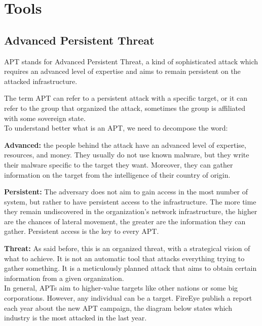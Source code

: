 \chapter{Tools}
\section{Advanced Persistent Threat}

APT stands for Advanced Persistent Threat, a kind of sophisticated attack which requires an advanced level of expertise and aims to remain persistent on the attacked infrastructure.

The term APT can refer to a persistent attack with a specific target, or it can refer to the group that organized the attack, sometimes the group is affiliated with some sovereign state.
\\

To understand better what is an APT, we need to decompose the word: 

\textbf{Advanced:} the people behind the attack have an advanced level of expertise, resources, and money. They usually do not use known malware, but they write their malware specific to the target they want. Moreover, they can gather information on the target from the intelligence of their country of origin.

\textbf{Persistent:}  The adversary does not aim to gain access in the most number of system, but rather to have persistent access to the infrastructure. The more time they remain undiscovered in the organization's network infrastructure, the higher are the chances of lateral movement, the greater are the information they can gather. Persistent access is the key to every APT.

\textbf{Threat:} As said before, this is an organized threat, with a strategical vision of what to achieve. It is not an automatic tool that attacks everything trying to gather something. It is a meticulously planned attack that aims to obtain certain information from a given organization. \cite{apt_def}
\\

In general, APTs aim to higher-value targets like other nations or some big corporations. However, any individual can be a target. FireEye publish a report each year about the new APT campaign, the diagram below states which industry is the most attacked in the last year.\\

